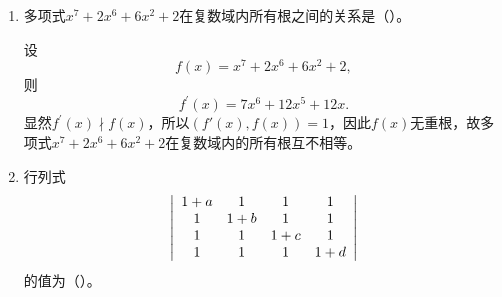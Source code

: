 \begin{enumerate}[1~]
\begin{enumerate}[1.~]
\item
多项式$x ^ { 7 } + 2 x ^ { 6 } + 6 x ^ { 2 } + 2$在复数域内所有根之间的关系是（\quad）。
\begin{solution}
设\[
f(x)=x ^ { 7 } + 2 x ^ { 6 } + 6 x ^ { 2 } + 2,
\]
则\[
f^{\prime} (x)=7x^6+12x^5+12x.
\]
显然$f^{\prime}(x)\nmid f(x)$，所以$(f'(x), f(x))=1$，因此$f(x)$无重根，故多项式$x ^ { 7 } + 2 x ^ { 6 } + 6 x ^ { 2 } + 2$在复数域内的所有根互不相等。
\end{solution}

\item
行列式 
$$
\left| \begin{array} { c c c c } { 1 + a } & { 1 } & { 1 } & { 1 } \\ { 1 } & { 1 + b } & { 1 } & { 1 } \\ { 1 } & { 1 } & { 1 + c } & { 1 } \\ { 1 } & { 1 } & { 1 } & { 1 + d } \end{array} \right|
$$
的值为（\quad）。
\begin{solution}

\end{solution}
\end{enumerate}
\end{enumerate}
